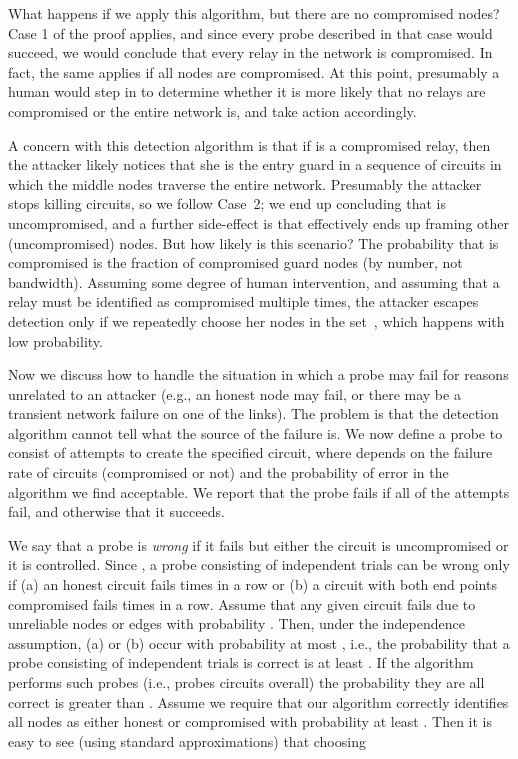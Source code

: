 \documentclass[]{lmcs}
\begin{document}
What happens if we apply this algorithm, but there are
no compromised nodes?  Case 1 of the proof applies, and since
every probe described in that case would succeed, we would conclude
that every relay in the network is compromised.  
In fact, the same applies if all nodes are compromised.
At this point,
presumably a human would step in to determine whether it is more likely that
no relays are compromised or the entire network is, and take
action accordingly.

A concern with this detection algorithm is that if 
is a compromised relay, then
the attacker likely notices that she is the entry guard in a
sequence of circuits in which the middle nodes traverse the
entire network.  Presumably the attacker stops killing circuits,
so we follow Case~2; we end up concluding that  is 
uncompromised, and a further side-effect is that  effectively
ends up framing other (uncompromised) nodes.  But how likely is
this scenario?  The probability that  is compromised is the
fraction of compromised guard nodes (by number, not bandwidth).
Assuming some degree of human intervention, and assuming that
a relay must be identified as compromised multiple times,
the attacker escapes detection only if we repeatedly choose
her nodes in the set~, which happens with low
probability.

Now we discuss how to handle the situation in which a probe may
fail for reasons unrelated to an attacker (e.g., an honest node
may fail, or there may be a transient network failure on one 
of the links).  The problem is that the detection algorithm cannot
tell what the source of the failure is.  We now define a probe to
consist of  attempts to create the specified circuit, where 
depends on the failure rate of circuits (compromised
or not)
and the probability of error in the algorithm we find acceptable.
We report that the probe fails if all  of the attempts fail, and
otherwise that it succeeds.  

We say that a probe is \emph{wrong}
if it fails but either the circuit is uncompromised or it is controlled.
Since ,
a probe consisting of  independent
trials can be wrong only if (a) an honest circuit fails  times in
a row or (b) a circuit with both end points compromised fails  
times in a row. 
Assume that any given circuit fails due to unreliable
nodes or edges with probability .
Then, under the independence assumption, 
(a) or (b) occur 
with probability at most , i.e., the probability that a probe
consisting of  independent trials is correct is at least . 
If the algorithm performs  such probes (i.e., probes  circuits
overall) the probability they
are all correct is greater than . Assume we require that
our algorithm correctly identifies all nodes as either honest or
compromised with probability at least . Then it is
easy to see (using standard approximations) that choosing 
\end{document}
